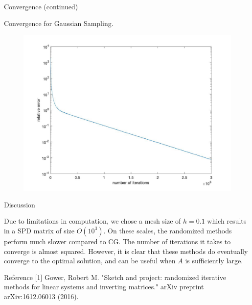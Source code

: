 \documentclass[final, 20pt]{beamer}
\newlength{\onecolwid}
\begin{document}
\begin{frame}[t]
\begin{columns}[t]
\begin{column}{\onecolwid}
\begin{block}{Convergence (continued)}
\begin{flushleft}
Convergence for Gaussian Sampling. 
\begin{figure}
	\centering
	\includegraphics[scale=0.7]{cd_pd_convergence}
\end{figure}
\end{flushleft}
\end{block}

\begin{alertblock}{Discussion}
\begin{flushleft}
Due to limitations in computation, we chose a mesh size of $h=0.1$ which results in a SPD matrix of size $O(10^3)$. On these scales, the randomized methods perform much slower compared to CG. The number of iterations it takes to converge is almost squared. However, it is clear that these methods do eventually converge to the optimal solution, and can be useful when $A$ is sufficiently large. 
\end{flushleft}
\end{alertblock}


\begin{alertblock}{Reference}
[1] Gower, Robert M. "Sketch and project: randomized iterative methods for linear systems and inverting matrices." arXiv preprint arXiv:1612.06013 (2016).


\end{alertblock}
\end{column}
\end{columns}
\end{frame}
\end{document}

